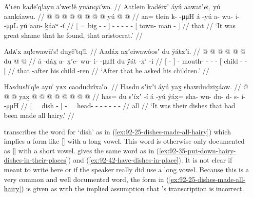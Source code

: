\ex\label{ex:92-23-great-shame-found}%
%
\begingl
	\glpreamble	Ā′ʟēn kadē′q!ayu ā′wet!ê yuānqā′wo. //
	\glpreamble	Aatlein kadéixʼ áyú aawatʼei, yú aanḵáawu. //
	\gla	{}  @ {}  @ {} @ {} {}
		 @ {}
		 @ {} @ {} @ {} @ {}
		{} yú  @ {} @ {} {} //
	\glb	{} aa= tlein k-  -μμH {}
		á -yú
		a- wu- i-  -μμL
		{} yú aan- ḵáaʷ -í {} //
	\glc	{}[ = big -  - {}]
		 -
		- - -  -
		{}[  town- man - {}] //
	\gld	{}  {}  {} {} {}
		 {}
		 {} {} {} {}
		{} that  {} {} {} //
	\glft	‘It was great shame that he found, that aristocrat.’
		//
\endgl
\xe

\ex\label{ex:92-24-asked-children}%
%
\begingl
	\glpreamble	Adᴀ′x aq!ewawū′s! duỵê′tq!î. //
	\glpreamble	Aadáx̱ ax̱ʼeiwawóosʼ du ÿátxʼi. //
	\gla	{}  @ {} {}
		 @ {} @ {} @ {} @ {} @ {}
		{} du  @ {} @ {} {} //
	\glb	{} á -dáx̱ {} a- x̱ʼe- wu- i-  -μμH
		{} du ÿát -xʼ -í {} //
	\glc	{}[  - {}]
		- mouth- - -  -
		{}[  child - - {}] //
	\gld	{} that -after {}
		 {} {} {} {} {}
		{} his child -ren {} {} //
	\glft	‘After that he asked his children.’
		//
\endgl
\xe

\ex\label{ex:92-25-dishes-made-all-hairy}%
%
\begingl
	\glpreamble	Hᴀsdus!ī′q!e ayu′ yᴀx caodudzîxa′o. //
	\glpreamble	Hasdu sʼíxʼi áyú yax̱ shawdudzix̱áaw. //
	\gla	{}  @ {}  @ {} {}  @ {}
		yax̱ @  @ {} @ {} @ {} @ {} @ {} @ {} @ {} //
	\glb	{} has= du sʼíxʼ -í {} á -yú
		ÿáx̱= sha- wu- du- d- s- i-  -μμH //
	\glc	{}[ =  dish - {}]  -
		= head- - - - - -
			 - //
	\gld	{}  {}  {} {}  {}
		all  {} {} {} {} {} {} {} //
	\glft	‘It was their dishes that had been made all hairy.’
		//
\endgl
\xe

\citeauthor{swanton:1909} transcribes the word for ‘dish’ as  in (\ref{ex:92-25-dishes-made-all-hairy}) which implies a form like  [] with a long vowel.
This word is otherwise only documented as  [] with a short vowel.
\citeauthor{swanton:1909} gives the same word as  in (\ref{ex:92-35-put-down-hairy-dishes-in-their-places}) and (\ref{ex:92-42-have-dishes-in-place}).
It is not clear if \citeauthor{swanton:1909} meant to write  here or if the speaker really did use a long vowel.
Because this is a very common and well documented word, the form in (\ref{ex:92-25-dishes-made-all-hairy}) is given as  with the implied assumption that \citeauthor{swanton:1909}’s transcription is incorrect.

